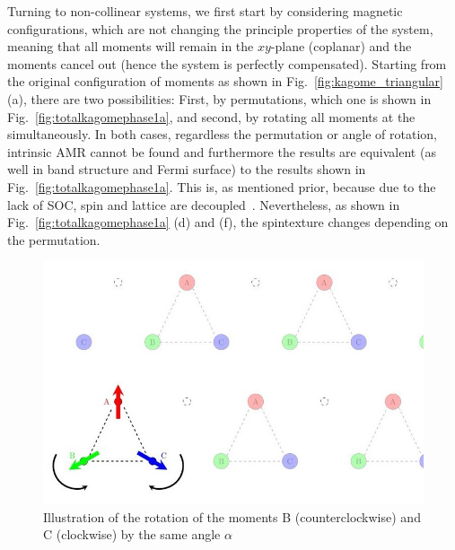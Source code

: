 \documentclass[prb,showpacs,amsmath,amssymb,superscriptaddress,twocolumn,floatfix]{revtex4-1}
\begin{document}
Turning to non-collinear systems, we first start by considering magnetic configurations, which are not changing the principle properties of the system, meaning that all moments will remain in the $xy$-plane (coplanar) and the moments cancel out (hence the system is perfectly compensated). Starting from the original configuration of moments as shown in Fig.~\ref{fig:kagome_triangular} (a), there are two possibilities: First, by permutations, which one is shown in Fig.~\ref{fig:totalkagomephase1a}, and second, by rotating all moments at the simultaneously. In both cases, regardless the permutation or angle of rotation, intrinsic AMR cannot be found and furthermore the results are equivalent (as well in band structure and Fermi surface) to the results shown in
Fig.~\ref{fig:totalkagomephase1a}. This is, as mentioned prior, because due to the lack of SOC, spin and lattice are decoupled~\cite{Gonzalez-Hernandez:2024}. Nevertheless, as shown in Fig.~\ref{fig:totalkagomephase1a} (d) and (f), the spintexture changes depending on the permutation. 

\begin{figure}
	\centering
	\includegraphics[width=0.9\linewidth]{img/kagome_rotation}
	\caption{Illustration of the rotation of the moments B (counterclockwise) and C (clockwise) by the same angle $\alpha$}
	\label{fig:kagomerotation}
\end{figure}
\end{document}
